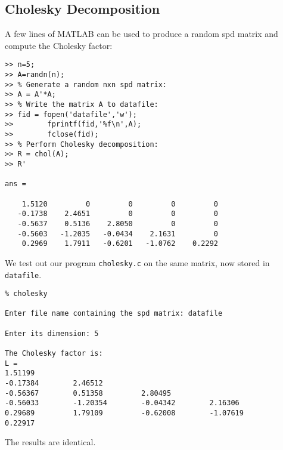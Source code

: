 \documentclass{article}
\begin{document}
\subsection{Cholesky Decomposition}
A few lines of MATLAB can be used to produce a random spd matrix and
compute the Cholesky factor:
\begin{verbatim}
>> n=5;
>> A=randn(n);
>> % Generate a random nxn spd matrix:
>> A = A'*A;
>> % Write the matrix A to datafile:
>> fid = fopen('datafile','w');
>>        fprintf(fid,'%f\n',A);
>>        fclose(fid);
>> % Perform Cholesky decomposition:
>> R = chol(A);
>> R'
 
ans =
 
    1.5120         0         0         0         0
   -0.1738    2.4651         0         0         0
   -0.5637    0.5136    2.8050         0         0
   -0.5603   -1.2035   -0.0434    2.1631         0
    0.2969    1.7911   -0.6201   -1.0762    0.2292
\end{verbatim}
We test out our program {\tt cholesky.c} on the same matrix, now
stored in {\tt datafile}.
\begin{verbatim}
% cholesky
 
Enter file name containing the spd matrix: datafile
 
Enter its dimension: 5
 
The Cholesky factor is: 
L = 
1.51199
-0.17384        2.46512
-0.56367        0.51358         2.80495
-0.56033        -1.20354        -0.04342        2.16306
0.29689         1.79109         -0.62008        -1.07619        0.22917
\end{verbatim}
The results are identical.
\end{document}

